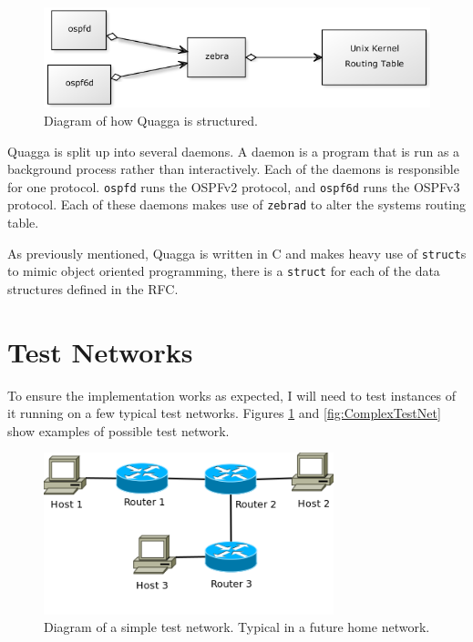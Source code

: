 \documentclass[12pt]{report}
\begin{document}
\begin{figure}
\centering
\includegraphics[width=\textwidth]{../Diagrams/UML/quaggaZebra.png}
\caption{Diagram of how Quagga is structured.}
\end{figure}

Quagga is split up into several daemons. A daemon is a program that is run as
a background process rather than interactively. Each of the daemons is
responsible for one protocol. \texttt{ospfd} runs the OSPFv2 protocol, and
\texttt{ospf6d} runs the OSPFv3 protocol. Each of these daemons makes use of 
\texttt{zebrad} to alter the systems routing table. 

As previously mentioned, Quagga is written in C and makes heavy use of
\texttt{struct}s to mimic object oriented programming, there is a
\texttt{struct} for each of the data structures defined in the RFC. 

\section{Test Networks}
To ensure the implementation works as expected, I will need to test instances of it
running on a few typical test networks. Figures \ref{fig:SimpleTestNet} and
\ref{fig:ComplexTestNet} show examples of possible test network.

\begin{figure}
\centering
\includegraphics[width=0.75\textwidth]{../Diagrams/Network/SimpleTestNet.png}
\caption{Diagram of a simple test network. Typical in a future home network.}
\label{fig:SimpleTestNet}
\end{figure}
\end{document}
